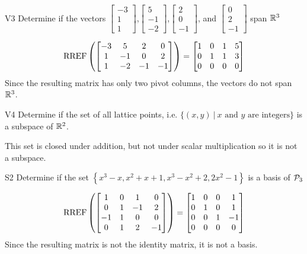 \documentclass{sbgLAquiz}
\begin{document}
\begin{problem}{V3}
Determine if the vectors  $\begin{bmatrix} -3 \\ 1 \\ 1 \end{bmatrix}$,$\begin{bmatrix} 5 \\ -1 \\ -2 \end{bmatrix}$,$\begin{bmatrix}2 \\ 0 \\ -1 \end{bmatrix}$, and $\begin{bmatrix} 0 \\ 2 \\ -1\end{bmatrix}$ span $\IR^3$
\end{problem}
\begin{solution}
$$\RREF\left(\begin{bmatrix}
-3 & 5 & 2 & 0 \\ 1 & -1 & 0 & 2 \\ 1 & -2 & -1 & -1 \end{bmatrix}\right)=\begin{bmatrix} 1 & 0 & 1 & 5 \\ 0 & 1 & 1 & 3 \\ 0 & 0 & 0 & 0\end{bmatrix}$$
Since the resulting matrix has only two pivot columns, the vectors do not span $\IR^3$.
\end{solution}


\begin{extract}\newpage\end{extract}
\begin{problem}{V4}
Determine if the set of all lattice points, i.e. $\{(x,y)\ \big|\ \text{$x$ and $y$ are integers} \}$ is a subspace of $\IR^2$.
\end{problem}
\begin{solution}
This set is closed under addition, but not under scalar multiplication so it is not a subspace.
\end{solution}

\begin{problem}{S2}
Determine if the set $\left\{ x^3-x, x^2+x+1, x^3-x^2+2, 2x^2-1 \right\}$ is a basis of $\P_3$
\end{problem}
\begin{solution}
$$\RREF\left(\begin{bmatrix} 1 & 0 & 1 & 0 \\ 0 & 1 & -1 & 2 \\ -1 & 1 & 0 & 0 \\ 0 & 1 & 2 & -1 \end{bmatrix} \right)= \begin{bmatrix} 1 & 0 &0 & 1 \\ 0 & 1 & 0 & 1 \\ 0 & 0 & 1 & -1 \\ 0 & 0 & 0 & 0 \end{bmatrix}$$
Since the resulting matrix is not the identity matrix, it is not a basis.
\end{solution}
\end{document}
